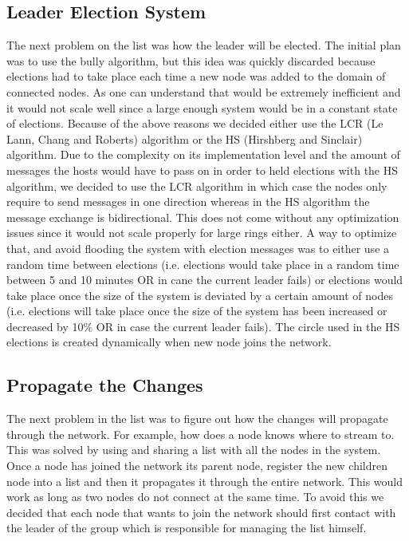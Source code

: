 \subsection{Leader Election System}

The next problem on the list was how the leader will be elected. The initial plan was to use the bully algorithm, but this idea was quickly discarded because elections had to take place each time a new node was added to the domain of connected nodes. As one can understand that would be extremely inefficient and it would not scale well since a large enough system would be in a constant state of elections. Because of the above reasons we decided either use the LCR (Le Lann, Chang and Roberts) algorithm or the HS (Hirshberg and Sinclair) algorithm. Due to the complexity on its implementation level and the amount of messages the hosts would have to pass on in order to held elections with the HS algorithm, we decided to use the LCR algorithm in which case the nodes only require to send messages in one direction whereas in the HS algorithm the message exchange is bidirectional. This does not come without any optimization issues since it would not scale properly for large rings either. A way to optimize that, and avoid flooding the system with election messages was to either use a random time between elections (i.e. elections would take place in a random time between 5 and 10 minutes OR in cane the current leader fails) or elections would take place once the size of the system is deviated by a certain amount of nodes (i.e. elections will take place once the size of the system has been increased or decreased by 10\% OR in case the current leader fails). The circle used in the HS elections is created dynamically when  new node joins the network. \\

\subsection{Propagate the Changes}

The next problem in the list was to figure out how the changes will propagate through the network. For example, how does a node knows where to stream to. This was solved by using and sharing a list with all the nodes in the system. Once a node has joined the network its parent node, register the new children node into a list and then it propagates it through the entire network. This would work as long as two nodes do not connect at the same time. To avoid this we decided that each node that wants to join the network should first contact with the leader of the group which is responsible for managing the list himself. \\


